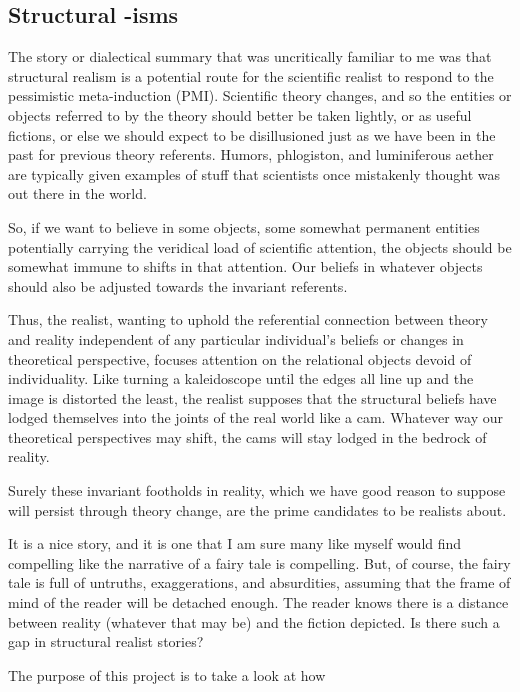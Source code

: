 \documentclass{article}
\begin{document}
\subsection{Structural -isms}


The story or dialectical summary that was uncritically familiar to me was that structural realism is a potential route for the scientific realist to respond to the pessimistic meta-induction (PMI).  Scientific theory changes, and so the entities or objects referred to by the theory should better be taken lightly, or as useful fictions, or else we should expect to be disillusioned just as we have been in the past for previous theory referents.  Humors, phlogiston, and luminiferous aether are typically given examples of stuff that scientists once mistakenly thought was out there in the world.

So, if we want to believe in some objects, some somewhat permanent entities potentially carrying the veridical load of scientific attention, the objects should be somewhat immune to shifts in that attention.  Our beliefs in whatever objects should also be adjusted towards the invariant referents.

Thus, the realist, wanting to uphold the referential connection between theory and reality independent of any particular individual's beliefs or changes in theoretical perspective, focuses attention on the relational objects devoid of individuality.  Like turning a kaleidoscope until the edges all line up and the image is distorted the least, the realist supposes that the structural beliefs have lodged themselves into the joints of the real world like a cam.  Whatever way our theoretical perspectives may shift, the cams will stay lodged in the bedrock of reality.

Surely these invariant footholds in reality, which we have good reason to suppose will persist through theory change, are the prime candidates to be realists about.

It is a nice story, and it is one that I am sure many like myself would find compelling like the narrative of a fairy tale is compelling.  But, of course, the fairy tale is full of untruths, exaggerations, and absurdities, assuming that the frame of mind of the reader will be detached enough.  The reader knows there is a distance between reality (whatever that may be) and the fiction depicted.  Is there such a gap in structural realist stories?

The purpose of this project is to take a look at how 
\end{document}
